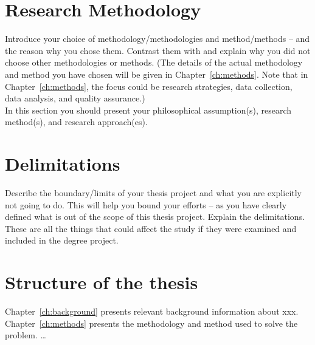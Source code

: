\documentclass[english]{kththesis}
\begin{document}
\section{Research Methodology}
Introduce your choice of methodology/methodologies and method/methods – and the reason why you chose them. Contrast them with and explain why you did not choose other methodologies or methods. (The details of the actual methodology and method you have chosen will be given in Chapter~\ref{ch:methods}. Note that in Chapter~\ref{ch:methods}, the focus could be research strategies, data collection, data analysis, and quality assurance.)\\
In this section you should present your philosophical assumption(s), research method(s), and research approach(es).

\section{Delimitations}
Describe the boundary/limits of your thesis project and what you are explicitly not going to do. This will help you bound your efforts – as you have clearly defined what is out of the scope of this thesis project. Explain the delimitations. These are all the things that could affect the study if they were examined and included in the degree project.

\section{Structure of the thesis}
Chapter~\ref{ch:background} presents relevant background information about xxx.  Chapter~\ref{ch:methods} presents the methodology and method used to solve the problem. …
\end{document}
